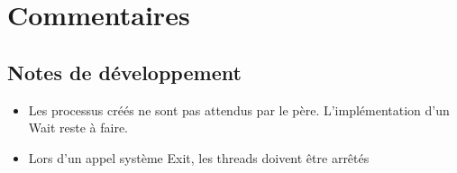 \documentclass{report}
\begin{document}
\chapter{Commentaires}

\section{Notes de développement}

\begin{itemize}
  \item Les processus créés ne sont pas attendus par le père. L'implémentation d'un Wait reste à faire.
  \item Lors d'un appel système Exit, les threads doivent être arrêtés
\end{itemize}
\end{document}
